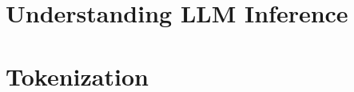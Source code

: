 \chapter{Understanding LLM Inference}




\chapter{Tokenization}
\label{ch:transformer:tokenization}



